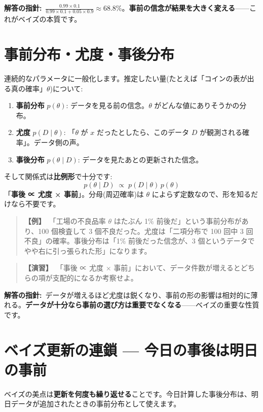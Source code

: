 \documentclass{article}
\begin{document}
\textbf{解答の指針:}\ \(\frac{0.99 \times 0.1}{0.99 \times 0.1 + 0.05 \times 0.9} \approx 68.8\%\)。\textbf{事前の信念が結果を大きく変える}——これがベイズの本質です。

\section{事前分布・尤度・事後分布}

連続的なパラメータに一般化します。推定したい量(たとえば「コインの表が出る真の確率」\(\theta\))について:

\begin{enumerate}
\item \textbf{事前分布} \(p(\theta)\): データを見る前の信念。\(\theta\) がどんな値にありそうかの分布。
\item \textbf{尤度} \(p(D \mid \theta)\): 「\(\theta\) が \(x\) だったとしたら、このデータ \(D\) が観測される確率」。データ側の声。
\item \textbf{事後分布} \(p(\theta \mid D)\): データを見たあとの更新された信念。
\end{enumerate}

そして関係式は\textbf{比例形}で十分です:
\[ p(\theta \mid D) \;\propto\; p(D \mid \theta) \, p(\theta) \]
「\textbf{事後 ∝ 尤度 × 事前}」。分母(周辺確率)は \(\theta\) によらず定数なので、形を知るだけなら不要です。

\begin{quote}
\textbf{【例】}\ 「工場の不良品率 \(\theta\) はたぶん 1\% 前後だ」という事前分布があり、100 個検査して 3 個不良だった。尤度は「二項分布で 100 回中 3 回不良」の確率。事後分布は「1\% 前後だった信念が、3 個というデータでやや右に引っ張られた形」になります。
\end{quote}

\begin{quote}
\textbf{【演習】}\ 「事後 ∝ 尤度 × 事前」において、データ件数が増えるとどちらの項が支配的になるか考察せよ。
\end{quote}

\textbf{解答の指針:}\ データが増えるほど尤度は鋭くなり、事前の形の影響は相対的に薄れる。\textbf{データが十分なら事前の選び方は重要でなくなる}——ベイズの重要な性質です。

\section{ベイズ更新の連鎖 — 今日の事後は明日の事前}

ベイズの美点は\textbf{更新を何度も繰り返せる}ことです。今日計算した事後分布は、明日データが追加されたときの事前分布として使えます。
\end{document}
